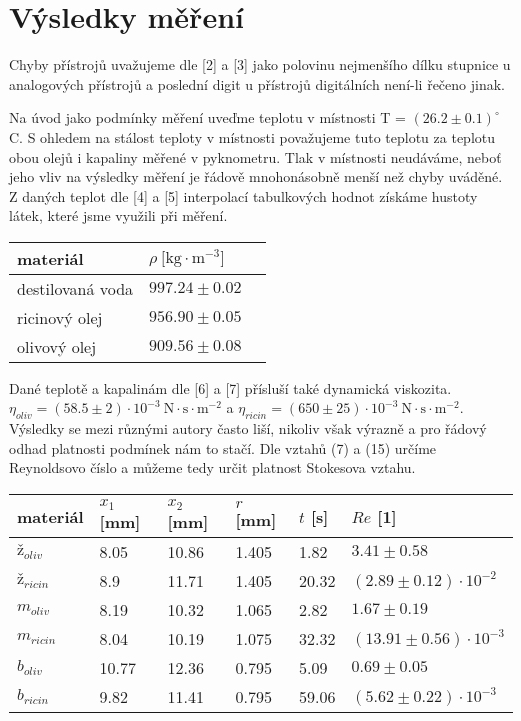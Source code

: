\documentclass[a4paper]{article}
\begin{document}
\section*{Výsledky měření}
\par Chyby přístrojů uvažujeme dle [2] a [3] jako polovinu nejmenšího dílku stupnice u analogových přístrojů a poslední digit u přístrojů digitálních není-li řečeno jinak.
\par Na úvod jako podmínky měření uveďme teplotu v místnosti T = $(26.2\pm0.1) ^{\circ}$ C. S ohledem na stálost teploty v místnosti považujeme tuto teplotu za teplotu obou olejů i kapaliny měřené v pyknometru. Tlak v místnosti neudáváme, neboť jeho vliv na výsledky měření je řádově mnohonásobně menší než chyby uváděné. Z daných teplot dle [4] a [5] interpolací tabulkových hodnot získáme hustoty látek, které jsme využili při měření.
\begin{center}
     \label{tab:title}
    \begin{tabular}{ | l | l | p{5cm} |} \hline
    materiál & $\rho \: \mathrm{[kg \cdot m^{-3}}]$   \\ \hline
    destilovaná voda & $997.24\pm0.02$ \\ \hline
    ricinový olej    & $956.90\pm0.05$ \\ \hline
    olivový olej    & $909.56\pm0.08$ \\ \hline
    \end{tabular}
\end{center}
\par Dané teplotě a kapalinám dle [6] a [7] přísluší také dynamická viskozita. $\eta_{oliv} = (58.5\pm2) \cdot 10^{-3} \: \mathrm{N \cdot s \cdot m^{-2}}$ a $\eta_{ricin} = (650\pm25) \cdot 10^{-3} \: \mathrm{N \cdot s \cdot m^{-2}}$. Výsledky se mezi různými autory často liší, nikoliv však výrazně a pro řádový odhad platnosti podmínek nám to stačí. Dle vztahů (7) a (15) určíme Reynoldsovo číslo a můžeme tedy určit platnost Stokesova vztahu.
\begin{center}
     \label{tab:title}
    \begin{tabular}{ | l | l | l | l | l | p{3cm} |} \hline
    materiál & $x_{1}$ [mm] & $x_{2}$ [mm] & $r$ [mm] & $t$ [s] & $Re$ [1]   \\ \hline
    $\textit{ž}_{oliv}$ & 8.05  & 10.86 & 1.405 & 1.82  & $3.41\pm0.58$ \\ \hline
    $\textit{ž}_{ricin}$ & 8.9   & 11.71 & 1.405 & 20.32 & $(2.89\pm0.12)  \cdot 10^{-2}$ \\ \hline
    $\textit{m}_{oliv}$ & 8.19  & 10.32 & 1.065 & 2.82  & $1.67\pm0.19$ \\ \hline
    $\textit{m}_{ricin}$ & 8.04  & 10.19 & 1.075 & 32.32 & $(13.91\pm0.56)  \cdot 10^{-3}$ \\ \hline
    $\textit{b}_{oliv}$ & 10.77 & 12.36 & 0.795 & 5.09  & $0.69\pm0.05$ \\ \hline
    $\textit{b}_{ricin}$ & 9.82  & 11.41 & 0.795 & 59.06 & $(5.62\pm0.22)  \cdot 10^{-3}$ \\ \hline
    \end{tabular}
\end{center}
\end{document}
